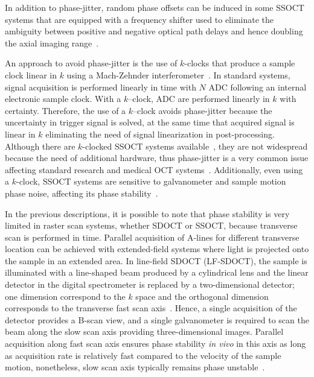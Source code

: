 In addition to phase-jitter, random phase offsets can be induced in some SSOCT systems that are equipped with a frequency shifter used to eliminate the ambiguity between positive and negative optical path delays and hence doubling the axial imaging range~\cite{Yun2004_Removing}.

An approach to avoid phase-jitter is the use of $k$-clocks that produce a sample clock linear in $k$ using a Mach-Zehnder interferometer~\cite{Johnson2016_Multispeed}. In standard systems, signal acquisition is performed linearly in time with $N$ ADC following an internal electronic sample clock. With a $k$--clock, ADC are performed linearly in $k$ with certainty. Therefore, the use of a $k$--clock avoids phase-jitter because the uncertainty in trigger signal is solved, at the same time that acquired signal is linear in $k$ eliminating the need of signal linearization in post-processing. Although there are $k$-clocked SSOCT systems available~\cite{Kumar2017_Invivo}, they are not widespread because the need of additional hardware, thus phase-jitter is a very common issue affecting standard research and medical OCT systems~\cite{Bouma2015_Optical}. Additionally, even using a $k$-clock, SSOCT systems are sensitive to galvanometer and sample motion phase noise, affecting its phase stability~\cite{Shemonski2014_Stability-1}.

In the previous descriptions, it is possible to note that phase stability is very limited in raster scan systems, whether SDOCT or SSOCT, because transverse scan is performed in time. Parallel acquisition of A-lines for different transverse location can be achieved with extended-field systems where light is projected onto the sample in an extended area. In line-field SDOCT (LF-SDOCT), the sample is illuminated with a line-shaped beam produced by a cylindrical lens and the linear detector in the digital spectrometer is replaced by a two-dimensional detector; one dimension correspond to the $k$ space and the orthogonal dimension corresponds to the transverse fast scan axis~\cite{Nakamura2007_Highspeed, Ginner2017_Noniterative}. Hence, a single acquisition of the detector provides a B-scan view, and a single galvanometer is required to scan the beam along the slow scan axis providing three-dimensional images. Parallel acquisition along fast scan axis ensures phase stability \textit{in vivo} in this axis as long as acquisition rate is relatively fast compared to the velocity of the sample motion, nonetheless, slow scan axis typically remains phase unstable~\cite{Ginner2017_Noniterative}.

